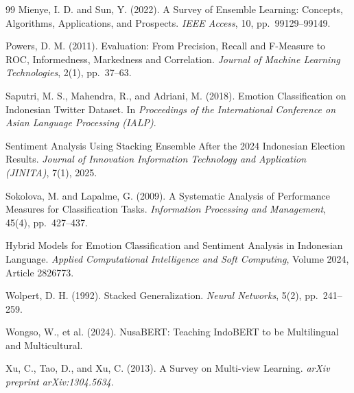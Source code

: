 \documentclass[12pt,a4paper,twoside]{article}
\theoremstyle{definition}
\begin{document}
\begin{thebibliography}{99}
Mienye, I. D. and Sun, Y. (2022).
\newblock A Survey of Ensemble Learning: Concepts, Algorithms, Applications, and Prospects.
\newblock \textit{IEEE Access}, 10, pp.~99129--99149.

Powers, D. M. (2011).
\newblock Evaluation: From Precision, Recall and F-Measure to ROC, Informedness, Markedness and Correlation.
\newblock \textit{Journal of Machine Learning Technologies}, 2(1), pp.~37--63.

Saputri, M. S., Mahendra, R., and Adriani, M. (2018).
\newblock Emotion Classification on Indonesian Twitter Dataset.
\newblock In \textit{Proceedings of the International Conference on Asian Language Processing (IALP)}.

Sentiment Analysis Using Stacking Ensemble After the 2024 Indonesian Election Results.
\newblock \textit{Journal of Innovation Information Technology and Application (JINITA)}, 7(1), 2025.

Sokolova, M. and Lapalme, G. (2009).
\newblock A Systematic Analysis of Performance Measures for Classification Tasks.
\newblock \textit{Information Processing and Management}, 45(4), pp.~427--437.

Hybrid Models for Emotion Classification and Sentiment Analysis in Indonesian Language.
\newblock \textit{Applied Computational Intelligence and Soft Computing}, Volume 2024, Article 2826773.

Wolpert, D. H. (1992).
\newblock Stacked Generalization.
\newblock \textit{Neural Networks}, 5(2), pp.~241--259.

Wongso, W., et al. (2024).
\newblock NusaBERT: Teaching IndoBERT to be Multilingual and Multicultural.

Xu, C., Tao, D., and Xu, C. (2013).
\newblock A Survey on Multi-view Learning.
\newblock \textit{arXiv preprint arXiv:1304.5634}.

\end{thebibliography}
\end{document}
